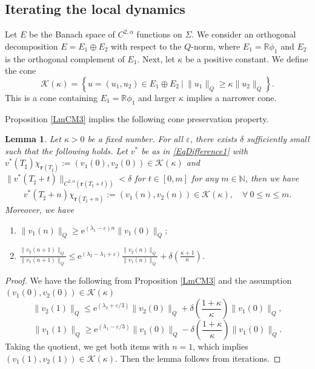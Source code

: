 \documentclass[12pt]{amsart}
\numberwithin{equation}{section}
\newtheorem{lemma}[theorem]{Lemma}
\numberwithin{equation}{section}
\newcommand{\eps}{\varepsilon}
\newcommand{\dt}{\delta}
\newcommand{\al}{\alpha}
\newcommand{\R}{\mathbb{R}}
\begin{document}
	\subsection{Iterating the local dynamics}\label{SS:The cone preservation property}
	
	Let $E$ be the Banach space of $C^{2,\al}$ functions on $\Sigma$. We consider an orthogonal decomposition $E=E_1\oplus E_2$ with respect to the $Q$-norm, where $E_1=\R \phi_1$ and $E_2$ is the orthogonal complement of $E_1$. Next, let $\kappa$ be a positive constant. We define the cone
	$$ \mathcal K(\kappa)=\left\{ u=(u_1,u_2)\in E_1\oplus E_2\ |\ \|u_1\|_Q\geq \kappa\|u_2\|_Q\right\}.$$
	This is a cone containing $E_1=\R\phi_1$ and larger $\kappa$ implies a narrower cone. 
	
	Proposition \ref{LmCM3} implies the following cone preservation property. 
	
	\begin{lemma} \label{LmSchlag} 
		Let $\kappa>0$ be a fixed number. For all $\eps$, there exists $\dt$ sufficiently small such that the following holds. 
		Let $v^*$ be as in  \eqref{EqDifference1}  with $v^*(T_\sharp)\chi_{\mathbf r({T_\sharp})}:=(v_1(0),v_2(0))\in \mathcal K(\kappa)$ and $\| v^*(T_\sharp+t)\|_{C^{2,\al}(\mathbf r({T_\sharp+t}))}<\dt $ for $t\in [0,m]$ for any $m\in\mathbb N$,  then we have $$v^*(T_\sharp+n)\chi_{\mathbf r({T_\sharp+n})}:= (v_1(n),v_2(n))\in\mathcal K(\kappa),\quad \forall \ 0\leq n\leq m.$$ Moreover, we have
		\begin{enumerate}
			\item $\|v_1(n)\|_Q\geq \mathrm{e}^{(\lambda_1-\eps)n}\|v_1(0)\|_Q;$
			\item $\frac{\|v_2(n+1)\|_Q}{\|v_1(n+1)\|_Q}\leq \mathrm{e}^{(\lambda_2-\lambda_1+\eps)}\frac{\|v_2(n)\|_Q}{\|v_1(n)\|_Q}+\dt\left(\frac{\kappa+1}{\kappa}\right)$. 
		\end{enumerate}
	\end{lemma}
	\begin{proof}
		We have the following from  Proposition \ref{LmCM3} and the assumption  $(v_1(0),v_2(0))\in \mathcal K(\kappa)$
		$$\|v_2(1)\|_Q\leq \mathrm{e}^{(\lambda_2+\eps/3)}\|v_2(0)\|_Q+\dt\left(\frac{1+\kappa}{\kappa}\right)\|v_1(0)\|_Q,$$$$\|v_1(1)\|_Q\geq \mathrm{e}^{(\lambda_1-\eps/3)}\|v_1(0)\|_Q-\dt\left(\frac{1+\kappa}{\kappa}\right)\|v_1(0)\|_Q.$$ 
		Taking the quotient, we get both items with $n=1$, which implies $(v_1(1),v_2(1))\in \mathcal K(\kappa)$. Then the lemma follows from iterations.  
	\end{proof}
	
\end{document}
